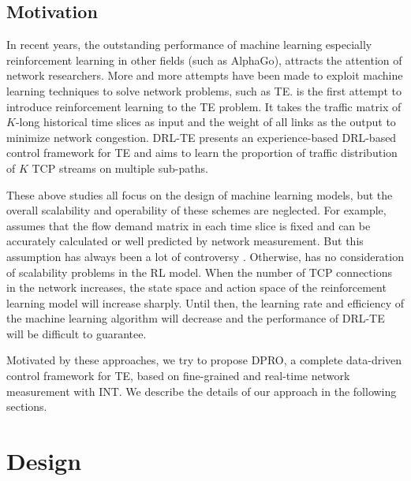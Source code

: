 \documentclass[10pt,conference]{IEEEtran}
\begin{document}
\subsection{Motivation}
In recent years, the outstanding performance of machine learning especially reinforcement learning in other fields (such as AlphaGo\cite{silver2016mastering}), attracts the attention of network researchers. More and more attempts have been made to exploit machine learning techniques to solve network problems, such as TE. \cite{learning-to-route} is the first attempt to introduce reinforcement learning to the TE problem. It takes the traffic matrix of $K$-long historical time slices as input and the weight of all links as the output to minimize network congestion. DRL-TE \cite{DRL-TE} presents an experience-based DRL-based control framework for TE and aims to learn the proportion of traffic distribution of $K$ TCP streams on multiple sub-paths.

These above studies all focus on the design of machine learning models, but the overall scalability and operability of these schemes are neglected. For example, \cite{learning-to-route} assumes that the flow demand matrix in each time slice is fixed and can be accurately calculated or well predicted by network measurement. But this assumption has always been a lot of controversy \cite{DRL-TE}. Otherwise, \cite{DRL-TE} has no consideration of scalability problems in the RL model. When the number of TCP connections in the network increases, the state space and action space of the reinforcement learning model will increase sharply. Until then, the learning rate and efficiency of the machine learning algorithm will decrease and the performance of DRL-TE will be difficult to guarantee.

Motivated by these approaches, we try to propose DPRO, a complete data-driven control framework for TE, based on fine-grained and real-time network measurement with INT. We describe the details of our approach in the following sections.

\section{Design}
\end{document}
